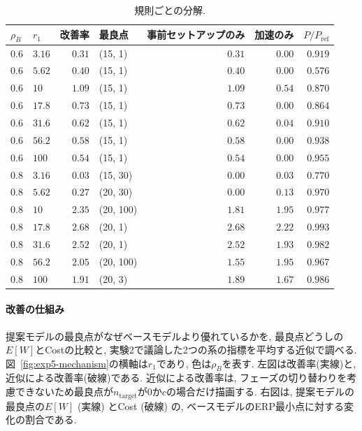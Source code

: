 \documentclass[a4paper, 11pt, dvipdfmx]{jsreport}
\begin{document}
\begin{table}[H]
\centering
\caption{規則ごとの分解.}
\label{tab:exp5-decomp}
\small
\begin{tabular}{llrlrrr}
\toprule
$\rho_B$ & $r_1$ & 改善率 & 最良点 & 事前セットアップのみ & 加速のみ & $P/P_{\mathrm{ref}}$ \\
\midrule
$0.6$ & $3.16$ & $0.31$ & (15, 1) & $0.31$ & $0.00$ & $0.919$ \\
$0.6$ & $5.62$ & $0.40$ & (15, 1) & $0.40$ & $0.00$ & $0.576$ \\
$0.6$ & $10$ & $1.09$ & (15, 1) & $1.09$ & $0.54$ & $0.870$ \\
$0.6$ & $17.8$ & $0.73$ & (15, 1) & $0.73$ & $0.00$ & $0.864$ \\
$0.6$ & $31.6$ & $0.62$ & (15, 1) & $0.62$ & $0.04$ & $0.910$ \\
$0.6$ & $56.2$ & $0.58$ & (15, 1) & $0.58$ & $0.00$ & $0.938$ \\
$0.6$ & $100$ & $0.54$ & (15, 1) & $0.54$ & $0.00$ & $0.955$ \\
\midrule
$0.8$ & $3.16$ & $0.03$ & (15, 30) & $0.00$ & $0.03$ & $0.770$ \\
$0.8$ & $5.62$ & $0.27$ & (20, 30) & $0.00$ & $0.13$ & $0.970$ \\
$0.8$ & $10$ & $2.35$ & (20, 100) & $1.81$ & $1.95$ & $0.977$ \\
$0.8$ & $17.8$ & $2.68$ & (20, 1) & $2.68$ & $2.22$ & $0.993$ \\
$0.8$ & $31.6$ & $2.52$ & (20, 1) & $2.52$ & $1.93$ & $0.982$ \\
$0.8$ & $56.2$ & $2.05$ & (20, 100) & $1.55$ & $1.95$ & $0.967$ \\
$0.8$ & $100$ & $1.91$ & (20, 3) & $1.89$ & $1.67$ & $0.986$ \\
\bottomrule
\end{tabular}
\end{table}

\paragraph{改善の仕組み}
提案モデルの最良点がなぜベースモデルより優れているかを, 最良点どうしの$E[W]$とCostの比較と, 実験2で議論した2つの系の指標を平均する近似で調べる.
図~\ref{fig:exp5-mechanism}の横軸は$r_1$であり, 色は$\rho_B$を表す. 左図は改善率(実線)と, 近似による改善率(破線)である.
近似による改善率は, フェーズの切り替わりを考慮できないため最良点が$n_{\mathrm{target}}$が$0$か$c$の場合だけ描画する. 右図は, 提案モデルの最良点の$E[W]$ (実線) とCost (破線) の,
ベースモデルのERP最小点に対する変化の割合である.
\end{document}
